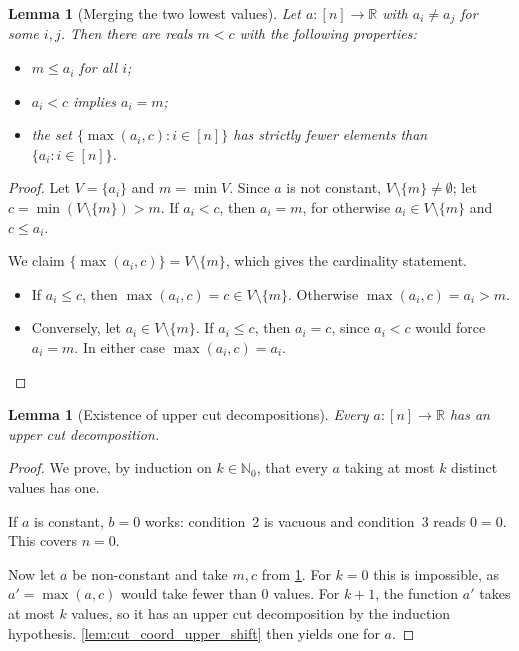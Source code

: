 \documentclass[11pt]{article}
\newtheorem{lemma}[theorem]{Lemma}
\theoremstyle{definition}
\theoremstyle{remark}
\newcommand{\R}{\mathbb{R}}
\newcommand{\Nz}{\mathbb{N}_0}
\begin{document}
\begin{lemma}[Merging the two lowest values]\label{lem:cut_coord_upper_reduce}
Let $a:[n]\to\R$ with $a_i\ne a_j$ for some $i,j$. Then there are reals $m<c$ with the following properties:
\begin{itemize}
\item $m\le a_i$ for all $i$;
\item $a_i<c$ implies $a_i=m$;
\item the set $\{\max(a_i,c):i\in[n]\}$ has strictly fewer elements than $\{a_i:i\in[n]\}$.
\end{itemize}
\end{lemma}
\begin{proof}
Let $V=\{a_i\}$ and $m=\min V$. Since $a$ is not constant, $V\setminus\{m\}\neq\emptyset$; let $c=\min(V\setminus\{m\})>m$. If $a_i<c$, then $a_i=m$, for otherwise $a_i\in V\setminus\{m\}$ and $c\le a_i$.

We claim $\{\max(a_i,c)\}=V\setminus\{m\}$, which gives the cardinality statement.
\begin{itemize}
\item If $a_i\le c$, then $\max(a_i,c)=c\in V\setminus\{m\}$. Otherwise $\max(a_i,c)=a_i>m$.
\item Conversely, let $a_i\in V\setminus\{m\}$. If $a_i\le c$, then $a_i=c$, since $a_i<c$ would force $a_i=m$. In either case $\max(a_i,c)=a_i$. \qedhere
\end{itemize}
\end{proof}

\begin{lemma}[Existence of upper cut decompositions]\label{lem:cut_coord_upper}
Every $a:[n]\to\R$ has an upper cut decomposition.
\end{lemma}
\begin{proof}
We prove, by induction on $k\in\Nz$, that every $a$ taking at most $k$ distinct values has one.

If $a$ is constant, $b=0$ works: condition~2 is vacuous and condition~3 reads $0=0$. This covers $n=0$.

Now let $a$ be non-constant and take $m,c$ from \cref{lem:cut_coord_upper_reduce}. For $k=0$ this is impossible, as $a'=\max(a,c)$ would take fewer than $0$ values. For $k+1$, the function $a'$ takes at most $k$ values, so it has an upper cut decomposition by the induction hypothesis. \cref{lem:cut_coord_upper_shift} then yields one for $a$.
\end{proof}
\end{document}
